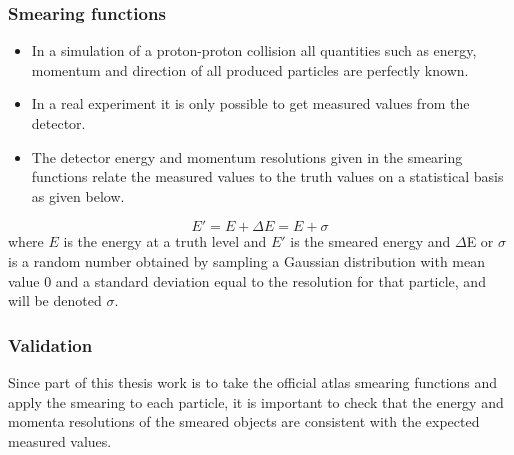 \documentclass[handout]{beamer}
\begin{document}
\begin{frame}[shrink=10]\frametitle{Smearing functions}
\begin{block}{}
\begin{itemize}
\item In a simulation of a proton-proton collision all quantities such as energy, momentum and direction of all produced particles are perfectly known. 
\item In a real experiment it is only possible to get measured values from the detector. 
\item The detector energy and momentum resolutions given in the smearing functions relate the measured values to the truth values on a statistical basis as given below.
\end{itemize}
\begin{equation*}
E' = E + \Delta E = E + \sigma
\end{equation*}
where $E$ is the energy at a truth level and $E'$ is the smeared energy and $\Delta$E or $\sigma$ is a random number obtained by sampling a Gaussian distribution with mean value 0 and a standard deviation equal to the resolution for that particle, and will be denoted $\sigma$.
\end{block}
\end{frame}

\begin{frame}[shrink=10]\frametitle{Validation}
\begin{block}{}
Since part of this thesis work is to take the official atlas smearing functions and apply the smearing to each particle, it is important to check that the energy and momenta resolutions of the smeared objects are consistent with the expected measured values. 
\end{block}
\end{frame}
\end{document}

